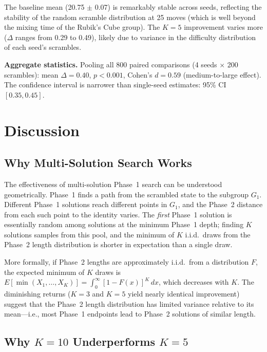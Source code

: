 \documentclass[10pt,twocolumn,a4paper]{article}
\begin{document}
The baseline mean (20.75 $\pm$ 0.07) is remarkably stable across seeds, reflecting the stability of the random scramble distribution at 25 moves (which is well beyond the mixing time of the Rubik's Cube group). The $K{=}5$ improvement varies more ($\Delta$ ranges from 0.29 to 0.49), likely due to variance in the difficulty distribution of each seed's scrambles.

\textbf{Aggregate statistics.} Pooling all 800 paired comparisons (4 seeds $\times$ 200 scrambles): mean $\Delta = 0.40$, $p < 0.001$, Cohen's $d = 0.59$ (medium-to-large effect). The confidence interval is narrower than single-seed estimates: 95\% CI $[0.35, 0.45]$.

\section{Discussion}
\label{sec:discussion}

\subsection{Why Multi-Solution Search Works}

The effectiveness of multi-solution Phase~1 search can be understood geometrically. Phase~1 finds a path from the scrambled state to the subgroup $G_1$. Different Phase~1 solutions reach different points in $G_1$, and the Phase~2 distance from each such point to the identity varies. The \emph{first} Phase~1 solution is essentially random among solutions at the minimum Phase~1 depth; finding $K$ solutions samples from this pool, and the minimum of $K$ i.i.d.\ draws from the Phase~2 length distribution is shorter in expectation than a single draw.

More formally, if Phase~2 lengths are approximately i.i.d.\ from a distribution $F$, the expected minimum of $K$ draws is $E[\min(X_1, \ldots, X_K)] = \int_0^\infty [1 - F(x)]^K \, dx$, which decreases with $K$. The diminishing returns ($K{=}3$ and $K{=}5$ yield nearly identical improvement) suggest that the Phase~2 length distribution has limited variance relative to its mean---i.e., most Phase~1 endpoints lead to Phase~2 solutions of similar length.

\subsection{Why $K{=}10$ Underperforms $K{=}5$}
\end{document}
